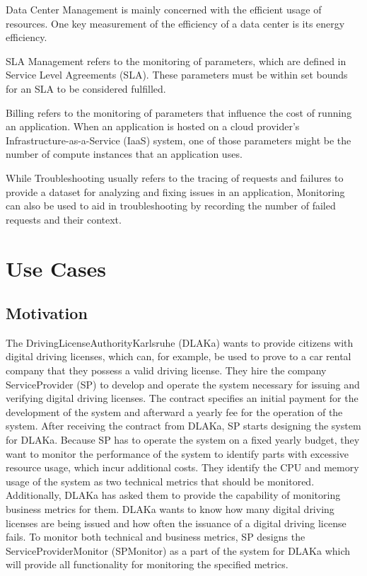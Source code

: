 Data Center Management is mainly concerned with the efficient usage of resources.
One key measurement of the efficiency of a data center is its energy efficiency.

SLA Management refers to the monitoring of parameters, which are defined in Service Level Agreements (SLA).
These parameters must be within set bounds for an SLA to be considered fulfilled.

Billing refers to the monitoring of parameters that influence the cost of running an application.
When an application is hosted on a cloud provider's Infrastructure-as-a-Service (IaaS) system,
one of those parameters might be the number of compute instances that an application uses.

While Troubleshooting usually refers to the tracing of requests and failures to provide a dataset for analyzing and fixing issues in an application,
Monitoring can also be used to aid in troubleshooting by recording the number of failed requests and their context.



\section{Use Cases}

\subsection{Motivation}
The DrivingLicenseAuthorityKarlsruhe (DLAKa) wants to provide citizens with digital driving licenses,
which can, for example, be used to prove to a car rental company that they possess a valid driving license.
They hire the company ServiceProvider (SP) to develop and operate the system necessary for issuing and verifying
digital driving licenses. The contract specifies an initial payment for the development of the system
and afterward a yearly fee for the operation of the system.
After receiving the contract from DLAKa, SP starts designing the system
for DLAKa. Because SP has to operate the system on a fixed yearly budget,
they want to monitor the performance of the system to identify parts with excessive resource usage, which
incur additional costs. They identify the CPU and memory usage of the system as two technical metrics that should be monitored.
Additionally, DLAKa has asked them to provide the capability of monitoring business metrics for them.
DLAKa wants to know how many digital driving licenses are being issued and how often the issuance of a digital
driving license fails. To monitor both technical and business metrics, SP designs the ServiceProviderMonitor (SPMonitor) as a part
of the system for DLAKa which will provide all functionality for monitoring the specified metrics.


